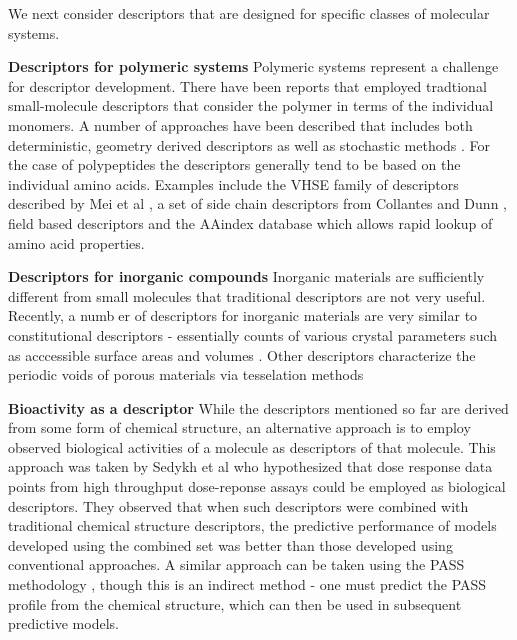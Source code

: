 \documentclass[letterpaper, 12pt]{article}
\begin{document}
We next consider descriptors that are designed for specific classes of
molecular systems.

\textbf{Descriptors for polymeric systems} Polymeric systems represent
a challenge for descriptor development. There have been reports that
employed tradtional small-molecule descriptors
\cite{Mattioni:2002dq,Katritzky:1998cr} that consider the polymer in
terms of the individual monomers. A number of approaches have been
described that includes both deterministic, geometry derived
descriptors \cite{Edvinsson:2003bh} as well as stochastic methods
\cite{Gonzales-Diaz:2003ly}. For the case of polypeptides the
descriptors generally tend to be based on the individual amino
acids. Examples include the VHSE family of descriptors described by
Mei et al \cite{Mei:2005kx}, a set of side chain descriptors from
Collantes and Dunn \cite{Collantes:1995vn}, field based descriptors
\cite{Norinder:1991ys} and the AAindex database
\cite{Kawashima:1999zr} which allows rapid lookup of amino acid
properties.

\textbf{Descriptors for inorganic compounds} Inorganic materials are
sufficiently different from small molecules that traditional
descriptors are not very useful. Recently, a number of descriptors for
inorganic materials are very similar to constitutional descriptors -
essentially counts of various crystal parameters such as acccessible
surface areas and volumes
\cite{Willems:2012zr,Haranczyk:2010ys,Mackay:1984ve}. Other
descriptors characterize the periodic voids of porous materials via
tesselation methods \cite{Anurova:2009ly,Carr:2009kx}

\textbf{Bioactivity as a descriptor} While the descriptors mentioned
so far are derived from some form of chemical structure, an
alternative approach is to employ observed biological activities of a
molecule as descriptors of that molecule.  This approach was taken by
Sedykh et al \cite{Sedykh:2011fk} who hypothesized that dose response
data points from high throughput dose-reponse assays could be employed
as biological descriptors. They observed that when such descriptors
were combined with traditional chemical structure descriptors, the
predictive performance of models developed using the combined set was
better than those developed using conventional approaches. A similar
approach can be taken using the PASS methodology
\cite{Poroikov:2007aa}, though this is an indirect method - one must
predict the PASS profile from the chemical structure, which can then
be used in subsequent predictive models.
\end{document}
